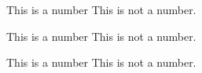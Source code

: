 \documentclass[12pt]{WisconsinThesis}
\begin{document}
\makeatletter

    {This is a number}
    {This is not a number.}
    
    {This is a number}
    {This is not a number.}
    
    {This is a number}
    {This is not a number.}
    

\makeatother
%
%
%
%
%
\end{document}
